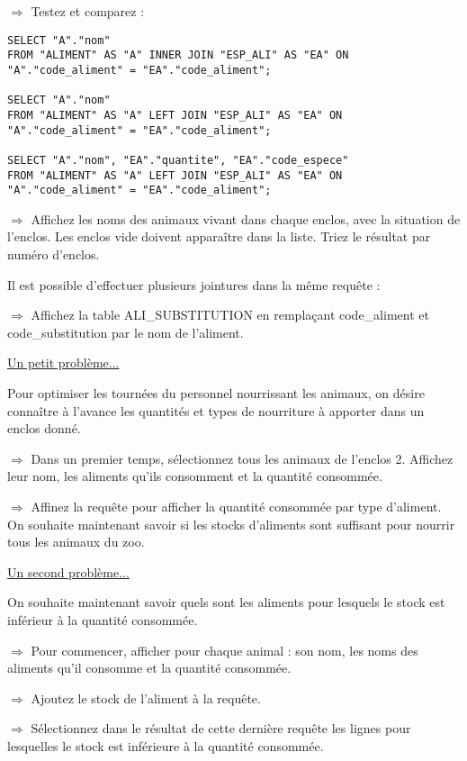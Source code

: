 \documentclass[11pt]{article}
\begin{document}
			$\Rightarrow$ Testez et comparez :
			\begin{lstlisting}
SELECT "A"."nom"
FROM "ALIMENT" AS "A" INNER JOIN "ESP_ALI" AS "EA" ON "A"."code_aliment" = "EA"."code_aliment";

SELECT "A"."nom"
FROM "ALIMENT" AS "A" LEFT JOIN "ESP_ALI" AS "EA" ON "A"."code_aliment" = "EA"."code_aliment";
			
SELECT "A"."nom", "EA"."quantite", "EA"."code_espece"
FROM "ALIMENT" AS "A" LEFT JOIN "ESP_ALI" AS "EA" ON "A"."code_aliment" = "EA"."code_aliment";
			\end{lstlisting}
			
			$\Rightarrow$ Affichez les noms des animaux vivant dans chaque enclos, avec la situation de l'enclos. Les enclos vide doivent apparaître dans la liste. Triez le résultat par numéro d'enclos.
			
			Il est possible d'effectuer plusieurs jointures dans la même requête :
			
			$\Rightarrow$ Affichez la table ALI\_SUBSTITUTION en remplaçant code\_aliment et code\_substitution par le nom de l'aliment.
			
			\underline{Un petit problème...}
			
			Pour optimiser les tournées du personnel nourrissant les animaux, on désire connaître à l'avance les quantités et types de nourriture à apporter dans un enclos donné.
			
			$\Rightarrow$ Dans un premier temps, sélectionnez tous les animaux de l'enclos 2. Affichez leur nom, les aliments qu'ils consomment et la quantité consommée.
			
			$\Rightarrow$ Affinez la requête pour afficher la quantité consommée par type d'aliment.
			On souhaite maintenant savoir si les stocks d'aliments sont suffisant pour nourrir tous les animaux du zoo.
			
			\underline{Un second problème...}
			
			On souhaite maintenant savoir quels sont les aliments pour lesquels le stock est inférieur à la quantité consommée.
			
			$\Rightarrow$ Pour commencer, afficher pour chaque animal : son nom, les noms des aliments qu'il consomme et la quantité consommée.
			
			$\Rightarrow$ Ajoutez le stock de l'aliment à la requête.
			
			$\Rightarrow$ Sélectionnez dans le résultat de cette dernière requête les lignes pour lesquelles le stock est inférieure à la quantité consommée.
			
\end{document}

